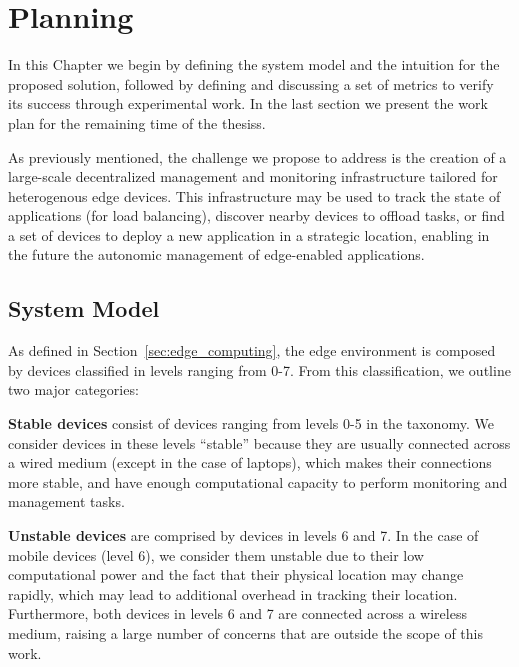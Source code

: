 \chapter{Planning} \label{cha:planning}

In this Chapter we begin by defining the system model and the intuition for the proposed solution, followed by defining and discussing a set of metrics to verify its success through experimental work. In the last section we present the work plan for the remaining time of the thesiss. 

As previously mentioned, the challenge we propose to address is the creation of a large-scale decentralized management and monitoring infrastructure tailored for heterogenous edge devices. This infrastructure may be used to track the state of applications (for load balancing), discover nearby devices to offload tasks, or find a set of devices to deploy a new application in a strategic location, enabling in the future the autonomic management of edge-enabled applications.

\section{System Model}

As defined in Section~\ref{sec:edge_computing}, the edge environment is composed by devices classified in levels ranging from 0-7. From this classification, we outline two major categories:  

\textbf{Stable devices} consist of devices ranging from levels 0-5 in the taxonomy. We consider devices in these levels ``stable'' because they are usually connected across a wired medium (except in the case of laptops), which makes their connections more stable, and have enough computational capacity to perform monitoring and management tasks. 

\textbf{Unstable devices} are comprised by devices in levels 6 and 7. In the case of mobile devices (level 6), we consider them unstable due to their low computational power and the fact that their physical location may change rapidly, which may lead to additional overhead in tracking their location. Furthermore, both devices in levels 6 and 7 are connected across a wireless medium, raising a large number of concerns that are outside the scope of this work.

